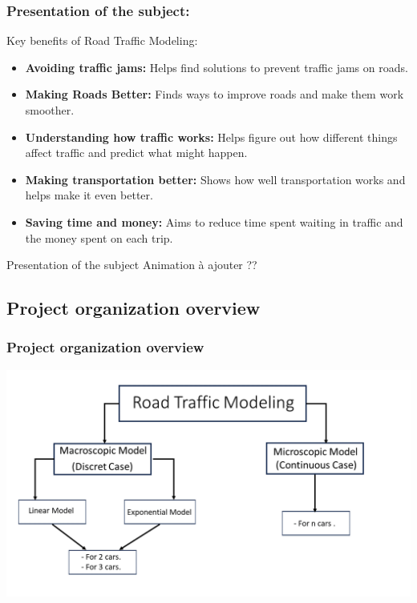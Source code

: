 \documentclass{beamer}
\begin{document}
\begin{frame}
        \frametitle{Presentation of the subject:}
	\begin{block}{Key benefits of Road Traffic Modeling:}
		\begin{itemize}
	\item \textbf{Avoiding traffic jams:} Helps find solutions to prevent traffic jams on roads.
	\item \textbf{Making Roads Better:} Finds ways to improve roads and make them work smoother.
	\item \textbf{Understanding how traffic works:} Helps figure out how different things affect traffic and predict what might happen.
	\item \textbf{Making transportation better:} Shows how well transportation works and helps make it even better.
	\item \textbf{Saving time and money:} Aims to reduce time spent waiting in traffic and the money spent on each trip.
\end{itemize}
	\end{block}
\end{frame}
\begin{frame}{Presentation of the subject}
    Animation à ajouter ??
\end{frame}
\begin{frame}
\subsection{Project organization overview}
\frametitle{Project organization overview}
\begin{center}
    \includegraphics[width=1\textwidth]{org1.png} 
    \end{center}
\end{frame}
\end{document}
